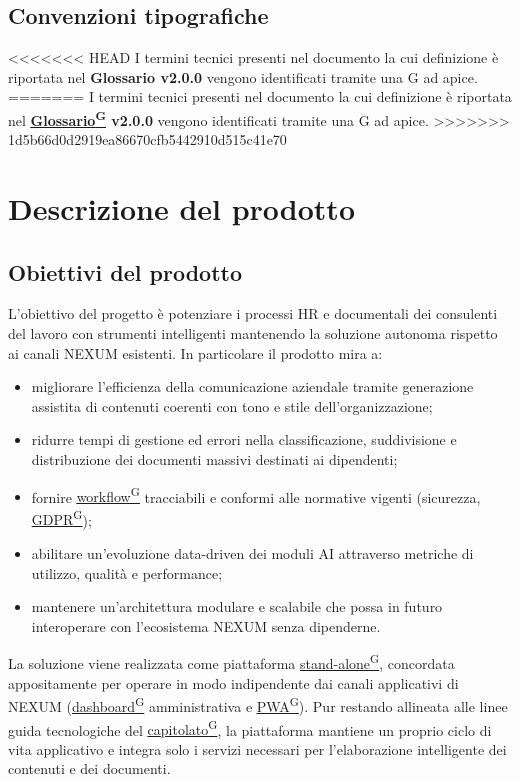 ﻿\documentclass[a4paper,12pt]{article}
\providecommand{\glslink}[2]{\href{https://alittlebyte-19.github.io/Documentazione/glossario.html\#gls-#1}{\underline{#2}\textsuperscript{\scriptsize G}}}
\begin{document}
\subsection{Convenzioni tipografiche}
<<<<<<< HEAD
I termini tecnici presenti nel documento la cui definizione è riportata nel \textbf{Glossario v2.0.0} vengono identificati tramite una G ad apice.
=======
I termini tecnici presenti nel documento la cui definizione è riportata nel \textbf{\glslink{glossario}{Glossario} v2.0.0} vengono identificati tramite una G ad apice.
>>>>>>> 1d5b66d0d2919ea86670cfb5442910d515c41e70
\section{Descrizione del prodotto}

\subsection{Obiettivi del prodotto}

L'obiettivo del progetto è potenziare i processi HR e documentali dei consulenti del lavoro con strumenti intelligenti mantenendo la soluzione autonoma rispetto ai canali NEXUM esistenti. In particolare il prodotto mira a:
\begin{itemize}
    \item migliorare l'efficienza della comunicazione aziendale tramite generazione assistita di contenuti coerenti con tono e stile dell'organizzazione;
    \item ridurre tempi di gestione ed errori nella classificazione, suddivisione e distribuzione dei documenti massivi destinati ai dipendenti;
    \item fornire \glslink{workflow}{workflow} tracciabili e conformi alle normative vigenti (sicurezza, \glslink{gdpr}{GDPR});
    \item abilitare un'evoluzione data-driven dei moduli AI attraverso metriche di utilizzo, qualità e performance;
    \item mantenere un'architettura modulare e scalabile che possa in futuro interoperare con l'ecosistema NEXUM senza dipenderne.
\end{itemize}
La soluzione viene realizzata come piattaforma \glslink{standalone}{stand-alone}, concordata appositamente per operare in modo indipendente dai canali applicativi di NEXUM (\glslink{dashboard}{dashboard} amministrativa e \glslink{pwa-progressive-web-app}{PWA}). Pur restando allineata alle linee guida tecnologiche del \glslink{capitolato}{capitolato}, la piattaforma mantiene un proprio ciclo di vita applicativo e integra solo i servizi necessari per l'elaborazione intelligente dei contenuti e dei documenti.
\end{document}
